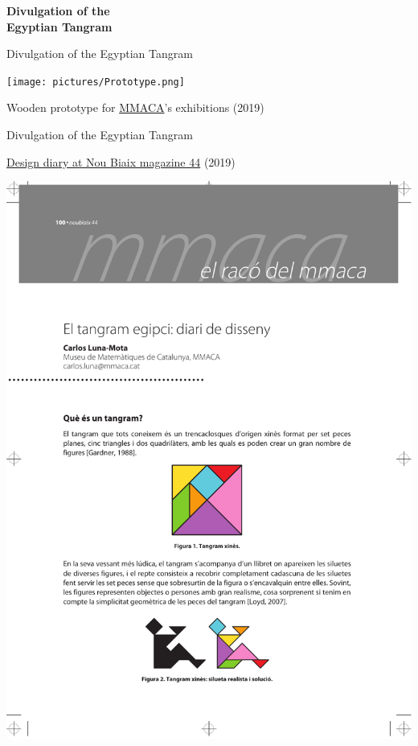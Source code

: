 \documentclass[14pt]{beamer}
\begin{document}

    \begin{frame}{}
        \begin{center}
            \textbf{\Huge Divulgation of the\\[1ex]Egyptian Tangram}\\
        \end{center}
    \end{frame}


    \begin{frame}{Divulgation of the Egyptian Tangram}
        \begin{center}
            \texttt{[image: pictures/Prototype.png]}\qquad\\

            \medskip

            Wooden prototype for \href{https://mmaca.cat/}{MMACA}'s exhibitions (2019)
        \end{center}
    \end{frame}


    \begin{frame}{Divulgation of the Egyptian Tangram}
        \begin{center}
            \begin{minipage}{0.5\textwidth}
                \href{https://publicacions.iec.cat/PopulaFitxa.do?idCatalogacio=33008}{Design diary at Nou Biaix magazine 44} (2019)
            \end{minipage}\quad\begin{minipage}{0.4\textwidth}
                \colorbox{white}{\includegraphics[height=30ex]{pictures/Diari de disseny - p01.pdf}}
            \end{minipage}
        \end{center}
    \end{frame}
\end{document}
